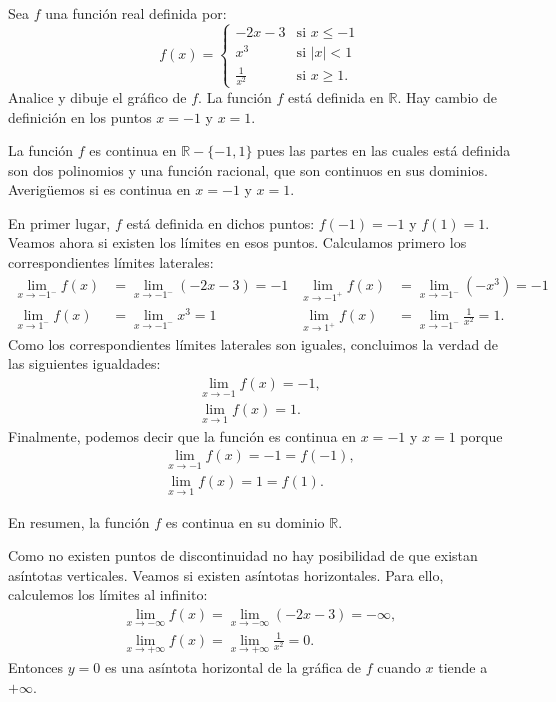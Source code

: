 \begin{exemplo}[Solución]{Sea $f$ una función real definida por:
\begin{equation*}
	f(x)=
\begin{cases}
-2x-3 & \text{si $x\leq -1$}\\
x^3 & \text{si $|x|<1$}\\
\frac{1}{x^2}& \text{si $x\geq 1$}.
\end{cases}
\end{equation*}
Analice y dibuje el gráfico de $f$.
}%
La función $f$ está definida en $\mathbb{R}$. Hay cambio de definición en los puntos $x=-1$ y
$x=1$.

La función $f$ es continua en $\mathbb{R} - \{-1,1\}$ pues las partes en las cuales está definida
son dos polinomios y una función racional, que son continuos en sus dominios. Averigüemos si es
continua en $x=-1$ y $x=1$.

En primer lugar, $f$ está definida en dichos puntos: $f(-1)=-1$ y $f(1)=1$. Veamos ahora si existen
los límites en esos puntos. Calculamos primero los correspondientes límites laterales:
\begin{align*}
\lim_{x\to -1^-}f(x)&=\lim_{x\to -1^-}(-2x-3)= -1 & \lim_{x\to -1^+}f(x)&=\lim_{x\to -1^-}(-x^3)= -1\\
\lim_{x\to 1^-}f(x)&=\lim_{x\to -1^-}x^3= 1 & \lim_{x\to 1^+}f(x)&=\lim_{x\to -1^-}\frac{1}{x^2}= 1.
\end{align*}
Como los correspondientes límites laterales son iguales, concluimos la verdad de las siguientes
igualdades:
\begin{gather*}
\lim_{x\to -1}f(x)=-1,\\
 \lim_{x\to1}f(x)=1.
\end{gather*}
Finalmente, podemos decir que la función es continua en $x=-1$ y $x=1$ porque
\begin{gather*}
\lim_{x\to -1}f(x)=-1= f(-1),\\
 \lim_{x\to1}f(x)=1=f(1).
\end{gather*}

En resumen, la función $f$ es continua en su dominio $\mathbb{R}$.

Como no existen puntos de discontinuidad no hay posibilidad de que existan asíntotas verticales.
Veamos si existen asíntotas horizontales. Para ello, calculemos los límites al infinito:
\begin{gather*}
\lim_{x\to -\infty} f(x) =\lim_{x\to -\infty} (-2x-3) = -\infty,\\
\lim_{x\to +\infty} f(x) =\lim_{x\to +\infty} \frac{1}{x^2} = 0.
\end{gather*}
Entonces $y=0$ es una asíntota horizontal de la gráfica de $f$ cuando $x$ tiende a $+\infty$.


\end{exemplo}
